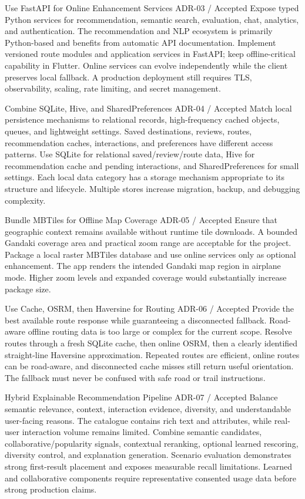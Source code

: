 \EvidenceSheet
{Use FastAPI for Online Enhancement Services}
{ADR-03 / Accepted}
{Expose typed Python services for recommendation, semantic search, evaluation, chat, analytics, and authentication.}
{The recommendation and NLP ecosystem is primarily Python-based and benefits from automatic API documentation.}
{Implement versioned route modules and application services in FastAPI; keep offline-critical capability in Flutter.}
{Online services can evolve independently while the client preserves local fallback.}
{A production deployment still requires TLS, observability, scaling, rate limiting, and secret management.}

\EvidenceSheet
{Combine SQLite, Hive, and SharedPreferences}
{ADR-04 / Accepted}
{Match local persistence mechanisms to relational records, high-frequency cached objects, queues, and lightweight settings.}
{Saved destinations, reviews, routes, recommendation caches, interactions, and preferences have different access patterns.}
{Use SQLite for relational saved/review/route data, Hive for recommendation cache and pending interactions, and SharedPreferences for small settings.}
{Each local data category has a storage mechanism appropriate to its structure and lifecycle.}
{Multiple stores increase migration, backup, and debugging complexity.}

\EvidenceSheet
{Bundle MBTiles for Offline Map Coverage}
{ADR-05 / Accepted}
{Ensure that geographic context remains available without runtime tile downloads.}
{A bounded Gandaki coverage area and practical zoom range are acceptable for the project.}
{Package a local raster MBTiles database and use online services only as optional enhancement.}
{The app renders the intended Gandaki map region in airplane mode.}
{Higher zoom levels and expanded coverage would substantially increase package size.}

\EvidenceSheet
{Use Cache, OSRM, then Haversine for Routing}
{ADR-06 / Accepted}
{Provide the best available route response while guaranteeing a disconnected fallback.}
{Road-aware offline routing data is too large or complex for the current scope.}
{Resolve routes through a fresh SQLite cache, then online OSRM, then a clearly identified straight-line Haversine approximation.}
{Repeated routes are efficient, online routes can be road-aware, and disconnected cache misses still return useful orientation.}
{The fallback must never be confused with safe road or trail instructions.}

\EvidenceSheet
{Hybrid Explainable Recommendation Pipeline}
{ADR-07 / Accepted}
{Balance semantic relevance, context, interaction evidence, diversity, and understandable user-facing reasons.}
{The catalogue contains rich text and attributes, while real-user interaction volume remains limited.}
{Combine semantic candidates, collaborative/popularity signals, contextual reranking, optional learned rescoring, diversity control, and explanation generation.}
{Scenario evaluation demonstrates strong first-result placement and exposes measurable recall limitations.}
{Learned and collaborative components require representative consented usage data before strong production claims.}

